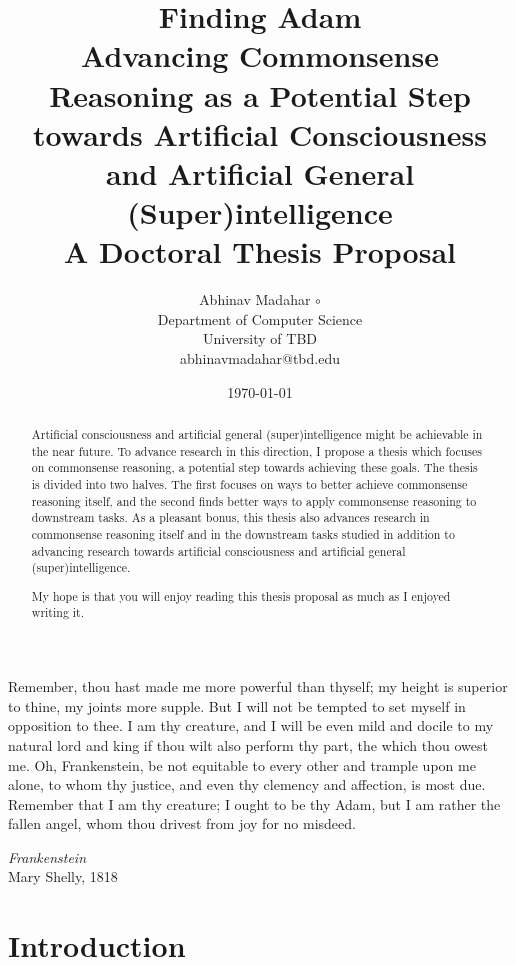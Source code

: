 \documentclass[12pt]{report}
\title{{\huge \textbf{Finding Adam}} \\ Advancing Commonsense Reasoning as a Potential Step towards Artificial Consciousness and Artificial General (Super)intelligence \vspace{1cm} \\ A Doctoral Thesis Proposal}
\author{Abhinav Madahar $\circ$ {\normalfont {\devanagari अभिनव मदहर}}  \\
Department of Computer Science \\
University of TBD \\
{\small abhinavmadahar@tbd.edu}}
\date{\today}
\begin{document}
\pagestyle{plain}
\maketitle

\pagebreak
\vspace*{\fill}
\noindent
Remember, thou hast made me more powerful than thyself; my height is superior to thine, my joints more supple.
But I will not be tempted to set myself in opposition to thee.
I am thy creature, and I will be even mild and docile to my natural lord and king if thou wilt also perform thy part, the which thou owest me.
Oh, Frankenstein, be not equitable to every other and trample upon me alone, to whom thy justice, and even thy clemency and affection, is
most due.
Remember that I am thy creature; I ought to be thy Adam, but I am rather the fallen angel, whom thou drivest from joy for no misdeed.

\vspace{1cm}

\noindent
\textit{Frankenstein} \\
Mary Shelly, 1818
\vspace*{\fill}

\pagebreak
\begin{abstract}
Artificial consciousness and artificial general (super)intelligence might be achievable in the near future.
To advance research in this direction, I propose a thesis which focuses on commonsense reasoning, a potential step towards achieving these goals.
The thesis is divided into two halves.
The first focuses on ways to better achieve commonsense reasoning itself, and the second finds better ways to apply commonsense reasoning to downstream tasks.
As a pleasant bonus, this thesis also advances research in commonsense reasoning itself and in the downstream tasks studied in addition to advancing research towards artificial consciousness and artificial general (super)intelligence.

My hope is that you will enjoy reading this thesis proposal as much as I enjoyed writing it.
\end{abstract}

\pagebreak
{}
\tableofcontents
\restoregeometry
\pagebreak

\cleardoublepage
{}

\newpage
\chapter{Introduction}
\end{document}
